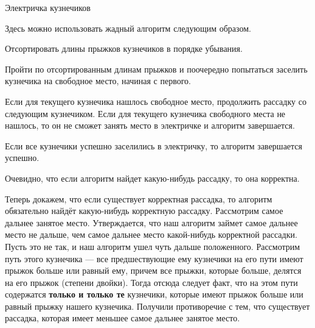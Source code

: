 \begin{tutorial}{Электричка кузнечиков}

Здесь можно использовать жадный алгоритм следующим образом.

Отсортировать длины прыжков кузнечиков в порядке убывания.

Пройти по отсортированным длинам прыжков и поочередно попытаться заселить кузнечика на свободное место, начиная с первого.

Если для текущего кузнечика нашлось свободное место, продолжить рассадку со следующим кузнечиком. Если для текущего кузнечика свободного места не нашлось, то он не сможет занять место в электричке и алгоритм завершается.

Если все кузнечики успешно заселились в электричку, то алгоритм завершается успешно.

Очевидно, что если алгоритм найдет какую-нибудь рассадку, то она корректна.

Теперь докажем, что если существует корректная рассадка, то алгоритм обязательно найдёт какую-нибудь корректную рассадку. Рассмотрим самое дальнее занятое место. Утверждается, что наш алгоритм займет самое дальнее место не дальше, чем самое дальнее место какой-нибудь корректной рассадки. Пусть это не так, и наш алгоритм ушел чуть дальше положенного. Рассмотрим путь этого кузнечика --- все предшествующие ему кузнечики на его пути имеют прыжок больше или равный ему, причем все прыжки, которые больше, делятся на его прыжок (степени двойки). Тогда отсюда следует факт, что на этом пути содержатся \textbf{только и только те} кузнечики, которые имеют прыжок больше или равный прыжку нашего кузнечика. Получили противоречие с тем, что существует рассадка, которая имеет меньшее самое дальнее занятое место.

\end{tutorial}

